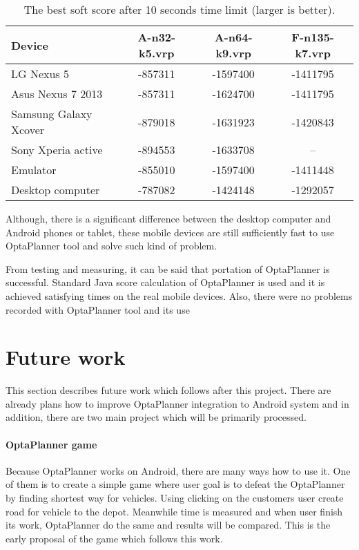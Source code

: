 \begin{table}[h!]
    \begin{tabular}{|l|c|c|c|}
        \hline
        \textbf{Device} &
        \textbf{A-n32-k5.vrp} &
        \textbf{A-n64-k9.vrp} &
        \textbf{F-n135-k7.vrp} \\ \hline \hline
        LG Nexus 5            & -857311 & -1597400 & -1411795 \\ \hline
        Asus Nexus 7 2013     & -857311 & -1624700 & -1411795 \\ \hline
        Samsung Galaxy Xcover & -879018 & -1631923 & -1420843 \\ \hline
        Sony Xperia active    & -894553 & -1633708 & --       \\ \hline
        Emulator              & -855010 & -1597400 & -1411448 \\ \hline
        Desktop computer      & -787082 & -1424148 & -1292057 \\ \hline
    \end{tabular}
    \centering
    \caption{The best soft score after 10 seconds time limit (larger is better).}
    \label{ScoreLimitTable}
\end{table}

Although, there is a significant difference between the desktop computer and Android phones or tablet, these mobile
devices are still sufficiently fast to use OptaPlanner tool and solve such kind of problem.

From testing and measuring, it can be said that portation of OptaPlanner is successful. Standard Java score calculation
of OptaPlanner is used and it is achieved satisfying times on the real mobile devices. Also, there were no problems
recorded with OptaPlanner tool and its use

\section{Future work}\label{FutureWorkSection}
This section describes future work which follows after this project. There are already plans how to improve OptaPlanner
integration to Android system and in addition, there are two main project which will be primarily processed.

\paragraph{OptaPlanner game}
Because OptaPlanner works on Android, there are many ways how to use it. One of them is to create a simple game where user
goal is to defeat the OptaPlanner by finding shortest way for vehicles. Using clicking on the customers user create road
for vehicle to the depot. Meanwhile time is measured and when user finish its work, OptaPlanner do the same and results
will be compared. This is the early proposal of the game which follows this work.

